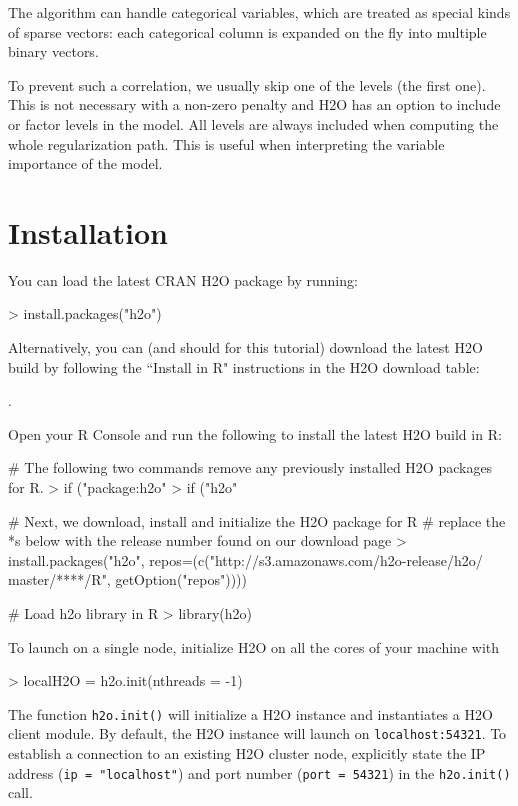 \documentclass[11pt]{article}
\begin{document}
The algorithm can handle categorical variables, which are treated as special kinds of sparse vectors: each categorical column is expanded on the fly into multiple binary vectors. 



To prevent such a correlation, we usually skip one of the levels (the first one). This is not necessary with a non-zero penalty and H2O has an option to include or factor levels in the model. All levels are always included when computing the whole regularization path. This is useful when interpreting the variable importance of the model. 

\section{Installation} 

You can load the latest CRAN H2O package by running:

\begin{spverbatim}
> install.packages("h2o")
\end{spverbatim}
\bigskip
\noindent
Alternatively, you can (and should for this tutorial) download the latest H2O build by following the ``Install in R" instructions in the H2O download table:

\indent \indent \indent {}.

\noindent
Open your R Console and run the following to install the latest H2O build in R:

\begin{spverbatim}
# The following two commands remove any previously installed H2O packages for R.
> if ("package:h2o" %
> if ("h2o" %

# Next, we download, install and initialize the H2O package for R
# replace the *s below with the release number found on our download page
> install.packages("h2o", repos=(c("http://s3.amazonaws.com/h2o-release/h2o/
master/****/R", getOption("repos"))))

# Load h2o library in R
> library(h2o)

\end{spverbatim}
\noindent
To launch on a single node, initialize H2O on all the cores of your machine with

\begin{spverbatim}
> localH2O = h2o.init(nthreads = -1)

\end{spverbatim}
\noindent
The function \texttt{h2o.init()} will initialize a H2O instance and instantiates a H2O client module. By default, the H2O instance will launch on \texttt{localhost:54321}. To establish a connection to an existing H2O cluster node, explicitly state the IP address (\texttt{ip = "localhost"}) and port number (\texttt{port = 54321}) in the \texttt{h2o.init()} call.
\end{document}
